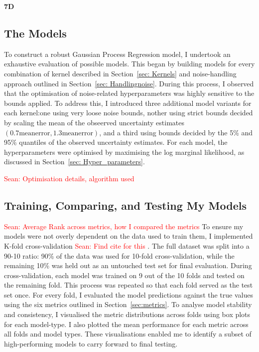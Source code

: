 \documentclass[11pt]{article}
\newcommand{\Sean}[1]{{\textcolor{red}{{Sean: #1}} }}
\begin{document}
\noindent
\textbf{7D}

\subsection{The Models}
To construct a robust Gaussian Process Regression model, I undertook an exhaustive evaluation of possible models.
This began by building models for every combination of kernel described in Section~\ref{sec: Kernels} and noise-handling approach outlined in Section~\ref{sec: Handlingnoise}.
During this process, I observed that the optimisation of noise-related hyperparameters was highly sensitive to the bounds applied. To address this, I introduced three additional model variants for each kernel:one using very loose noise bounds,
 nother using strict bounds decided by scaling the mean of the obseerved uncertainty estimates $(0.7\text{meanerror},1.3\text{meanerror})$, and a third using bounds decided by the 5\% and 95\% quantiles of the observed uncertainty estimates.
For each model, the hyperparameters were optimised by maximising the log marginal likelihood, as discussed in Section~\ref{sec: Hyper_parameters}.

\Sean{Optimisation details, algorithm used}

\subsection{Training, Comparing, and Testing My Models}

\Sean{Average Rank across metrics, how I compared the metrics}
To ensure my models were not overly dependent on the data used to train them, I implemented K-fold cross-validation \Sean{Find cite for this}. The full dataset was split into a 90-10 ratio: 90\% of the data was used for 10-fold cross-validation, while the remaining 10\% was held out as an untouched test set for final evaluation.
During cross-validation, each model was trained on 9 out of the 10 folds and tested on the remaining fold. This process was repeated so that each fold served as the test set once. For every fold, I evaluated the model predictions against the true values using the six metrics outlined in Section~\ref{sec:metrics}. 
To analyse model stability and consistency, I visualised the metric distributions across folds using box plots for each model-type. I also plotted the mean performance for each metric across all folds and model types. These visualisations enabled me to identify a subset of high-performing models to carry forward to final testing.
\end{document}
